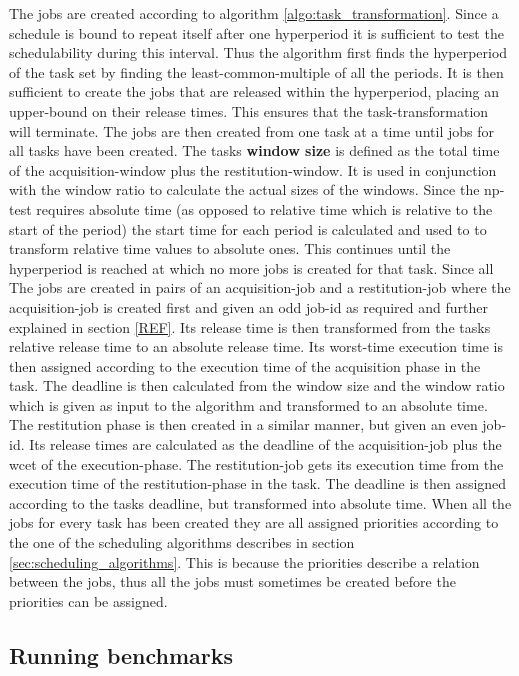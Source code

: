 \documentclass{kththesis}
\begin{document}
The jobs are created according to algorithm \ref{algo:task_transformation}. Since a schedule is
bound to repeat itself after one hyperperiod it is sufficient to test the schedulability during this
interval. Thus the algorithm first finds the hyperperiod of the task set by finding the
least-common-multiple of all the periods. It is then sufficient to create the jobs that are released
within the hyperperiod, placing an upper-bound on their release times. This ensures that the
task-transformation will terminate. The jobs are then created from one task at a time until jobs for
all tasks have been created. The tasks \textbf{window size} is defined as the total time of the
acquisition-window plus the restitution-window. It is used in conjunction with the window ratio to
calculate the actual sizes of the windows. Since the \acrshort{np}-test requires absolute time
(as opposed to relative time which is relative to the start of the period) the start time for each
period is calculated and used to to transform relative time values to absolute ones. This continues
until the hyperperiod is reached at which no more jobs is created for that task. Since all The jobs
are created in pairs of an acquisition-job and a restitution-job where the acquisition-job is
created first and given an odd job-id as required and further explained in section \ref{REF}. Its
release time is then transformed from the tasks relative release time to an absolute release time.
Its worst-time execution time is then assigned according to the execution time of the acquisition
phase in the task. The deadline is then calculated from the window size and the window ratio which
is given as input to the algorithm and transformed to an absolute time. The restitution phase is
then created in a similar manner, but given an even job-id. Its release times are calculated as the
deadline of the acquisition-job plus the \acrshort{wcet} of the execution-phase. The restitution-job
gets its execution time from the execution time of the restitution-phase in the task. The deadline
is then assigned according to the tasks deadline, but transformed into absolute time. When all the
jobs for every task has been created they are all assigned priorities according to the one of the
scheduling algorithms describes in section \ref{sec:scheduling_algorithms}. This is because the
priorities describe a relation between the jobs, thus all the jobs must sometimes be created before
the priorities can be assigned. 


\subsection{Running benchmarks}\label{subsec:running_benchmarks}
\end{document}
